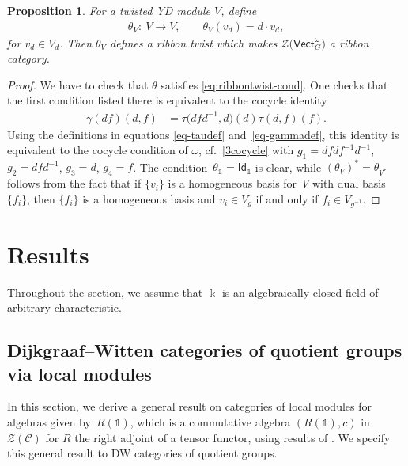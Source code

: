 \documentclass[10pt,a4paper]{amsart}
\numberwithin{equation}{section}
\newtheorem{Proposition}[Theorem]{Proposition}
 { \theoremstyle{definition}
\newtheorem{Definition}[Theorem]{Definition}
\newtheorem{Note}[Theorem]{Note}
\newtheorem{Notation}[Theorem]{Notation}
\newtheorem{Example}[Theorem]{Example}
\newtheorem{Remark}[Theorem]{Remark} }
\newcommand{\ide}{\mathsf{Id}}
\newcommand{\one}{\mathds{1}}
\newcommand{\Vect}{\mathsf{Vect}}
\newcommand{\cC}{\mathcal{C}}
\newcommand{\cZ}{\mathcal{Z}}
\begin{document}
\begin{Proposition}\label{prop:Zribbon}
For a twisted YD module $V$, define
\begin{align*}
\theta_V\colon\ V\to V, \qquad \theta_V(v_d)=d\cdot v_d,
\end{align*}
for $v_d\in V_d$. Then $\theta_V$ defines a ribbon twist which makes $\cZ\big(\Vect_G^\omega\big)$ a ribbon category.
\end{Proposition}
\begin{proof}
We have to check that $\theta$ satisfies \eqref{eq:ribbontwist-cond}. One checks that the first condition listed there is equivalent to the cocycle identity
\begin{align*}
 \gamma(df)(d,f)&=\tau\big(dfd^{-1},d\big)(d)\tau(d,f)(f).
\end{align*}
Using the definitions in equations \eqref{eq-taudef} and~\eqref{eq-gammadef}, this identity is equivalent to
the cocycle condition of $\omega$, cf.\ \eqref{3cocycle} with
$g_1=dfdf^{-1}d^{-1}$, $g_2=dfd^{-1}$, $g_3=d$, $g_4=f$. The condition~$\theta_\one=\ide_{\one}$ is clear, while $(\theta_V)^*=\theta_{V^*}$ follows from the fact that if $\{v_i\}$ is a homogeneous basis for~$V$ with dual basis~$\{f_i\}$, then $\{f_i\}$ is a homogeneous basis and $v_i\in V_g$ if and only if $f_i \in V_{g^{-1}}$.
\end{proof}



\section{Results}\label{sec:results}


Throughout the section, we assume that $\Bbbk$ is an algebraically closed field of arbitrary characteristic.


\subsection{Dijkgraaf--Witten categories of quotient groups via local modules}

In this section, we derive a general result on categories of local modules for algebras given by~$R(\one)$, which is a commutative algebra $(R(\one),c)$ in $\cZ(\cC)$ for $R$ the right adjoint of a tensor functor, using results of \cite{BN11,EGNO}. We specify this general result to DW categories of quotient groups.
\end{document}
